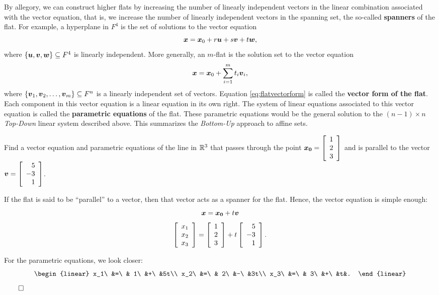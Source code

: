 By allegory, we can construct higher flats by increasing the number of linearly independent vectors in the linear combination associated with the vector equation, that is, we increase the number of linearly independent vectors in the spanning set, the so-called \textbf{spanners} of the flat. For example, a hyperplane in $F^4$ is the set of solutions to the vector equation 
\[\boldsymbol x = \boldsymbol x_0 + r\boldsymbol u + s\boldsymbol v + t\boldsymbol w,\] where $\{\boldsymbol u, \boldsymbol v, \boldsymbol w\}\subseteq F^4$ is linearly independent. More generally, an $m$-flat is the solution set to the vector equation
\begin{equation}\label{eq:flatvectorform} \boldsymbol x = \boldsymbol x_0 + \sum_{i=1}^m t_i\boldsymbol v_i, \end{equation} where $\{\boldsymbol v_1, \boldsymbol v_2, \ldots, \boldsymbol v_m\} \subseteq F^n$ is a linearly independent set of vectors. Equation \eqref{eq:flatvectorform} is called the \textbf{vector form of the flat}. Each component in this vector equation is a linear equation in its own right. The system of linear equations associated to this vector equation is called the \textbf{parametric equations} of the flat. These parametric equations would be the general solution to the $(n-1)\times n$ \emph{Top-Down} linear system described above. This summarizes the \emph{Bottom-Up} approach to affine sets.\\

\begin{Exam} Find a vector equation and parametric equations of the line in $\mathbb{R}^3$ that passes through the point $\boldsymbol{x_0} = \left[\begin{array}{r} 1\\2\\3 \end{array}\right]$ and is parallel to the vector $\boldsymbol v = \left[\begin{array}{r} 5\\-3\\1 \end{array}\right]$.\\

\begin{multicols}{2}
If the flat is said to be ``parallel''  to a vector, then that vector acts as a spanner for the flat. Hence, the vector equation is simple enough:
\[\boldsymbol x = \boldsymbol{x_0} + t\boldsymbol v\]
\[\left[\begin{array}{r} x_1\\x_2\\x_3 \end{array}\right] = \left[\begin{array}{r} 1\\2\\3 \end{array}\right] + t\left[\begin{array}{r} 5\\-3\\1 \end{array}\right].\]\columnbreak 

\mbox{}\vfill
For the parametric equations, we look closer:
\[\begin{linear}
x_1\ &=\ & 1\ &+\ &5t\\
x_2\ &=\ & 2\ &-\ &3t\\
x_3\ &=\ & 3\ &+\ &t&.
\end{linear} \]$\hfill\qedhere$
\end{multicols}
\end{Exam}\vs

